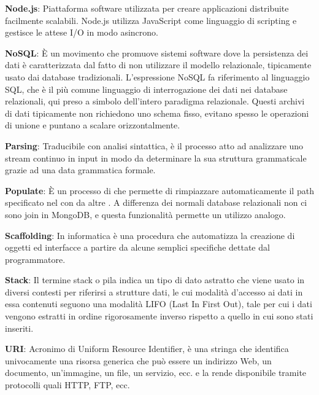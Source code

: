 \textbf{Node.js}: Piattaforma software utilizzata per creare applicazioni distribuite facilmente scalabili.
Node.js utilizza JavaScript come linguaggio di scripting e gestisce le attese I/O in modo asincrono.

\textbf{NoSQL}: È un movimento che promuove sistemi software dove la persistenza dei dati è caratterizzata dal fatto di non utilizzare il modello relazionale, tipicamente usato dai database tradizionali. L'espressione NoSQL fa riferimento al linguaggio SQL, che è il più comune linguaggio di interrogazione dei dati nei database relazionali, qui preso a simbolo dell'intero paradigma relazionale. Questi archivi di dati tipicamente non richiedono uno schema fisso, evitano spesso le operazioni di unione e puntano a scalare orizzontalmente.

\textbf{Parsing}: Traducibile con analisi sintattica, è il processo atto ad analizzare uno stream continuo in input in modo da determinare la sua struttura grammaticale grazie ad una data grammatica formale.

\textbf{Populate}: È un processo di  che permette di rimpiazzare automaticamente il path specificato nel  con  da altre . A differenza dei normali database relazionali non ci sono join in MongoDB, e questa funzionalità permette un utilizzo analogo.

\textbf{Scaffolding}: In informatica è una procedura che automatizza la creazione di oggetti ed interfacce a partire da alcune semplici specifiche dettate dal programmatore.

\textbf{Stack}: Il termine stack o pila indica un tipo di dato astratto che viene usato in diversi contesti per riferirsi a strutture dati, le cui modalità d'accesso ai dati in essa contenuti seguono una modalità LIFO (Last In First Out), tale per cui i dati vengono estratti in ordine rigorosamente inverso rispetto a quello in cui sono stati inseriti.

\textbf{URI}: Acronimo di Uniform Resource Identifier, è una stringa che identifica univocamente una risorsa generica che può essere un indirizzo Web, un documento, un'immagine, un file, un servizio, ecc. e la rende disponibile tramite protocolli quali HTTP, FTP, ecc.